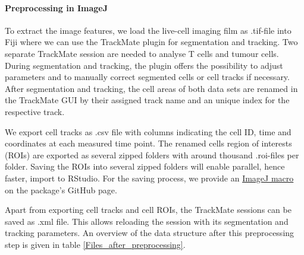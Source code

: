 \documentclass{report}
\begin{document}
\paragraph{Preprocessing in ImageJ} 
To extract the image features, we load the live-cell imaging film as .tif-file into Fiji where we can use the TrackMate plugin for segmentation and tracking. Two separate TrackMate session are needed to analyse T cells and tumour cells. During segmentation and tracking, the plugin offers the possibility to adjust parameters and to manually correct segmented cells or cell tracks if necessary. After segmentation and tracking, the cell areas of both data sets are renamed in the TrackMate GUI by their assigned track name and an unique index for the respective track. 

We export cell tracks as .csv file with columns indicating the cell ID, time and coordinates at each measured time point.
The renamed cells region of interests (ROIs) are exported as several zipped folders with around thousand .roi-files per folder. Saving the ROIs into several zipped folders will enable parallel, hence faster, import to RStudio. For the saving process, we provide an \href{https://github.com/juliaquach02/cellcontacts/blob/main/ImageJ_Macros/Macro_Rename_and_Save_ROIs_in_Subfolders.ijm}{ImageJ macro} on the package's GitHub page.
 
Apart from exporting cell tracks and cell ROIs, the TrackMate sessions can be saved as .xml file. This allows reloading the session with its segmentation and tracking parameters. 
An overview of the data structure after this preprocessing step is given in table \ref{Files_after_preprocessing}.
\end{document}

